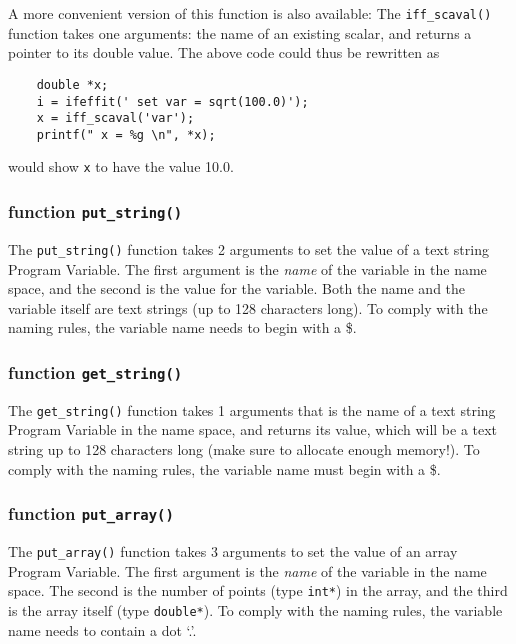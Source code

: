 A more convenient version of this function is also available: The
{\tt{iff\_scaval()}} function takes one arguments: the name of an existing
{\ifeffit} scalar, and returns a pointer to its double value.  The above
code could thus be rewritten as
\begin{verbatim}
    double *x;
    i = ifeffit(' set var = sqrt(100.0)');
    x = iff_scaval('var');
    printf(" x = %g \n", *x);
\end{verbatim}
\noindent
would show {\tt{x}} to have the value 10.0.



\subsubsection{function {\tt{put\_string()}}}\label{Ch:Scripting-cc:putstring}

The {\tt{put\_string()}} function takes 2 arguments to set the value of a
text string Program Variable.  The first argument is the {\emph{name}} of
the variable in the {\ifeffit} name space, and the second is the value for
the variable.  Both the name and the variable itself are text strings (up
to 128 characters long).  To comply with the {\ifeffit} naming rules, the
variable name needs to begin with a \$.
 
\subsubsection{function {\tt{get\_string()}}}\label{Ch:Scripting-cc:getstring}

The {\tt{get\_string()}} function takes 1 arguments that is the name of a
text string Program Variable in the {\ifeffit} name space, and returns its
value, which will be a text string up to 128 characters long (make sure to
allocate enough memory!).  To comply with the {\ifeffit} naming rules, the
variable name must begin with a \$.

\subsubsection{function {\tt{put\_array()}}}\label{Ch:Scripting-cc:putarray}

The {\tt{put\_array()}} function takes 3 arguments to set the value of an
array Program Variable.  The first argument is the {\emph{name}} of the
variable in the {\ifeffit} name space.  The second is the number of points
(type {\tt{int*}}) in the array, and the third is the array itself (type
{\tt{double*}}).  To comply with the {\ifeffit} naming rules, the variable
name needs to contain a dot `.'.

